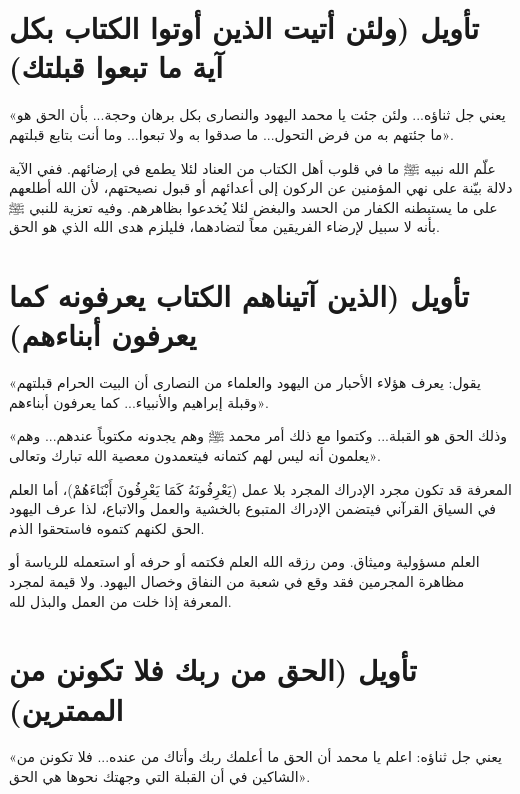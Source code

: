 \separator

\section{تأويل (ولئن أتيت الذين أوتوا الكتاب بكل آية ما تبعوا قبلتك)}
 «يعني جل ثناؤه... ولئن جئت يا محمد اليهود والنصارى بكل برهان وحجة... بأن الحق هو ما جئتهم به من فرض التحول... ما صدقوا به ولا تبعوا... وما أنت بتابع قبلتهم».

\begin{fawaid}
علّم الله نبيه ﷺ ما في قلوب أهل الكتاب من العناد لئلا يطمع في إرضائهم. ففي الآية دلالة بيّنة على نهي المؤمنين عن الركون إلى أعدائهم أو قبول نصيحتهم، لأن الله أطلعهم على ما يستبطنه الكفار من الحسد والبغض لئلا يُخدعوا بظاهرهم. وفيه تعزية للنبي ﷺ بأنه لا سبيل لإرضاء الفريقين معاً لتضادهما، فليلزم هدى الله الذي هو الحق.
\end{fawaid}

\separator

\section{تأويل (الذين آتيناهم الكتاب يعرفونه كما يعرفون أبناءهم)}
 «يقول: يعرف هؤلاء الأحبار من اليهود والعلماء من النصارى أن البيت الحرام قبلتهم وقبلة إبراهيم والأنبياء... كما يعرفون أبناءهم».

 «وذلك الحق هو القبلة... وكتموا مع ذلك أمر محمد ﷺ وهم يجدونه مكتوباً عندهم... وهم يعلمون أنه ليس لهم كتمانه فيتعمدون معصية الله تبارك وتعالى».

\begin{fawaid}
المعرفة قد تكون مجرد الإدراك المجرد بلا عمل (يَعْرِفُونَهُ كَمَا يَعْرِفُونَ أَبْنَاءَهُمْ)، أما العلم في السياق القرآني فيتضمن الإدراك المتبوع بالخشية والعمل والاتباع، لذا عرف اليهود الحق لكنهم كتموه فاستحقوا الذم.
\end{fawaid}

\begin{fawaid}
العلم مسؤولية وميثاق. ومن رزقه الله العلم فكتمه أو حرفه أو استعمله للرياسة أو مظاهرة المجرمين فقد وقع في شعبة من النفاق وخصال اليهود. ولا قيمة لمجرد المعرفة إذا خلت من العمل والبذل لله.
\end{fawaid}

\separator

\section{تأويل (الحق من ربك فلا تكونن من الممترين)}
 «يعني جل ثناؤه: اعلم يا محمد أن الحق ما أعلمك ربك وأتاك من عنده... فلا تكونن من الشاكين في أن القبلة التي وجهتك نحوها هي الحق».

